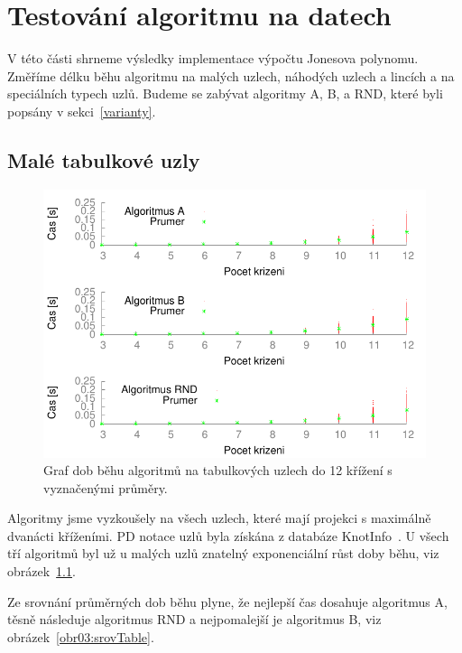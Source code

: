 
\chapter{Testování algoritmu na datech}

V této části shrneme výsledky implementace výpočtu Jonesova polynomu. Změříme délku běhu algoritmu na malých uzlech, náhodých uzlech a lincích a na speciálních typech uzlů.
Budeme se zabývat algoritmy A, B, a RND, které byli popsány v sekci~\ref{varianty}.

\section{Malé tabulkové uzly}

\begin{figure}[p]\centering
\includegraphics{../img/multiTable}
\caption{Graf dob běhu algoritmů na tabulkových uzlech do 12 křížení s vyznačenými průměry.}
\label{obr03:multiTable}
\end{figure}

Algoritmy jsme vyzkoušely na všech uzlech, které mají projekci s maximálně dvanácti kříženími. PD notace uzlů byla získána z databáze KnotInfo~\cite{knotinfo}.
U všech tří algoritmů byl už u malých uzlů znatelný exponenciální růst doby běhu, viz obrázek~\ref{obr03:multiTable}. 

Ze srovnání průměrných dob běhu plyne, že nejlepší čas dosahuje algoritmus A, těsně následuje algoritmus RND a nejpomalejší je algoritmus B, viz obrázek~\ref{obr03:srovTable}. 
	
